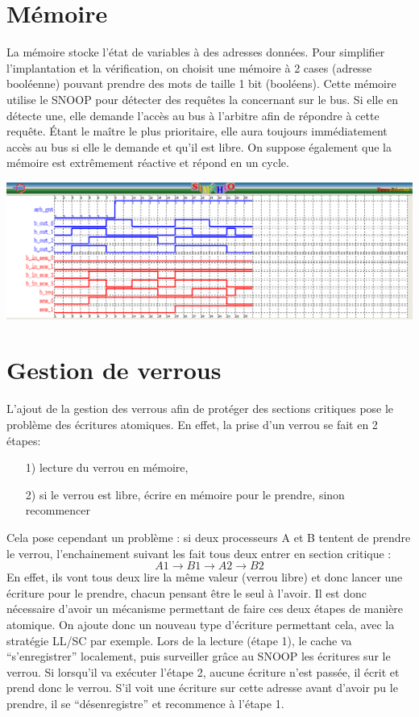 \documentclass[a4paper, 11pt]{article}
\begin{document}
\section{Mémoire}
La mémoire stocke l'état de variables à des adresses données. Pour simplifier
l'implantation et la vérification, on choisit une mémoire à 2 cases (adresse 
booléenne) pouvant prendre des mots de taille 1 bit (booléens). Cette mémoire
utilise le SNOOP pour détecter des requêtes la concernant sur le bus. Si elle
en détecte une, elle demande l'accès au bus à l'arbitre afin de répondre à
cette requête. \'Etant le maître le plus prioritaire, elle aura toujours
immédiatement accès au bus si elle le demande et qu'il est libre. On 
suppose également que la mémoire est extrêmement réactive et répond en un
cycle.
\begin{center}
\centerline{\includegraphics[scale=0.5]{images/mem.png}}
\end{center}

\section{Gestion de verrous}
L'ajout de la gestion des verrous afin de protéger des sections critiques
pose le problème des écritures atomiques. En effet, la prise d'un verrou se fait
en 2 étapes:
\begin{itemize}
  \item[1)] lecture du verrou en mémoire,
  \item[2)] si le verrou est libre, écrire en mémoire pour le prendre, sinon 
    recommencer
\end{itemize}
Cela pose cependant un problème : si deux processeurs A et B tentent de prendre
le verrou, l'enchainement suivant les fait tous deux entrer en section 
critique :
\[
A1 \rightarrow B1 \rightarrow A2 \rightarrow B2
\] 
En effet, ils vont tous deux lire la même valeur (verrou libre) et donc lancer
une écriture pour le prendre, chacun pensant être le seul à l'avoir. Il est
donc nécessaire d'avoir un mécanisme permettant de faire ces deux étapes de
manière atomique. On ajoute donc un nouveau type d'écriture permettant cela,
avec la stratégie LL/SC par exemple. Lors de la lecture (étape 1), le cache
va ``s'enregistrer'' localement, puis surveiller grâce au SNOOP les écritures
sur le verrou. Si lorsqu'il va exécuter l'étape 2, aucune écriture n'est passée,
il écrit et prend donc le verrou. S'il voit une écriture sur cette adresse avant
d'avoir pu le prendre, il se ``désenregistre'' et recommence à l'étape 1.
\end{document}
